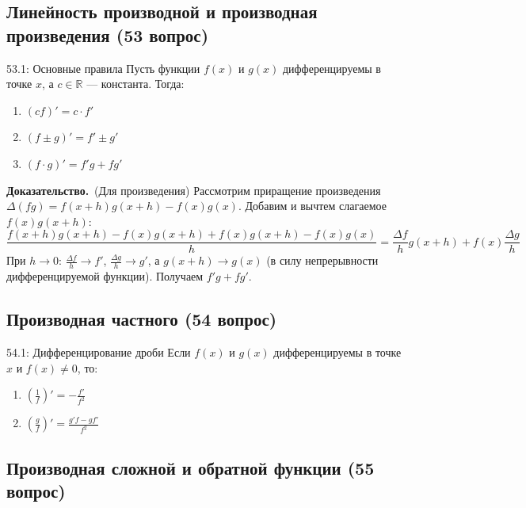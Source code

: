 \documentclass[a4paper,12pt]{article}
\newcommand{\myproof}{\textbf{Доказательство.}\ }
\begin{document}
	
	
	
	\vspace{1cm}
	\subsection{Линейность производной и производная произведения (53 вопрос)}
	
	\begin{theorembox}{53.1: Основные правила}
		Пусть функции $f(x)$ и $g(x)$ дифференцируемы в точке $x$, а $c \in \mathbb{R}$ — константа. Тогда:
		\begin{enumerate}
			\item $(cf)' = c \cdot f'$
			\item $(f \pm g)' = f' \pm g'$
			\item $(f \cdot g)' = f'g + fg'$
		\end{enumerate}
	\end{theorembox}
	
	\myproof (Для произведения)
	Рассмотрим приращение произведения $\Delta(fg) = f(x+h)g(x+h) - f(x)g(x)$. 
	Добавим и вычтем слагаемое $f(x)g(x+h)$:
	$$ \frac{f(x+h)g(x+h) - f(x)g(x+h) + f(x)g(x+h) - f(x)g(x)}{h} = \frac{\Delta f}{h}g(x+h) + f(x)\frac{\Delta g}{h} $$
	При $h \to 0$: $\frac{\Delta f}{h} \to f'$, $\frac{\Delta g}{h} \to g'$, а $g(x+h) \to g(x)$ (в силу непрерывности дифференцируемой функции). Получаем $f'g + fg'$.
	
	
	
	
	\subsection{Производная частного (54 вопрос)}
	
	\begin{theorembox}{54.1: Дифференцирование дроби}
		Если $f(x)$ и $g(x)$ дифференцируемы в точке $x$ и $f(x) \neq 0$, то:
		\begin{enumerate}
			\item $\left( \frac{1}{f} \right)' = -\frac{f'}{f^2}$
			\item $\left( \frac{g}{f} \right)' = \frac{g'f - gf'}{f^2}$
		\end{enumerate}
	\end{theorembox}
	
	
	
	
	
	\vspace{1cm}
	\subsection{Производная сложной и обратной функции (55 вопрос)}
	
\end{document}
